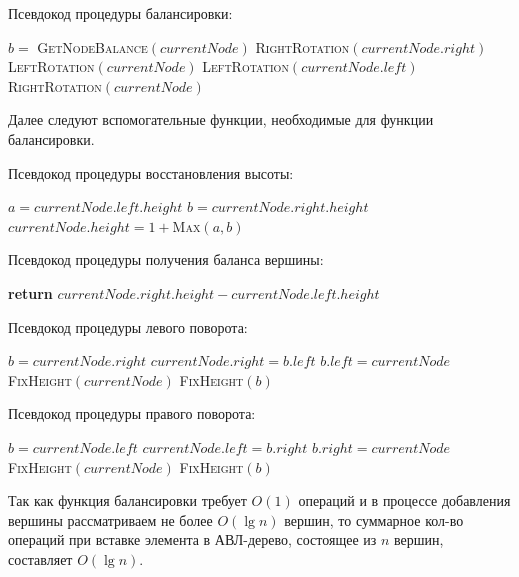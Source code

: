\noindent Псевдокод процедуры балансировки:
\begin{algorithmic}[1]
		\State $b =$ \textsc{GetNodeBalance}$(currentNode)$
				\State \textsc{RightRotation}$(currentNode.right)$
			\EndIf
			\State \textsc{LeftRotation}$(currentNode)$
		\EndIf
				\State \textsc{LeftRotation}$(currentNode.left)$
			\EndIf
			\State \textsc{RightRotation}$(currentNode)$
		\EndIf
	\EndProcedure
\end{algorithmic}

Далее следуют вспомогательные функции, необходимые для функции балансировки.

\noindent Псевдокод процедуры восстановления высоты:
\begin{algorithmic}[1]
	\State $a = currentNode.left.height$
	\State $b = currentNode.right.height$
	\State $currentNode.height = 1+$\textsc{Max}$(a, b)$
	\EndProcedure
\end{algorithmic}

\noindent Псевдокод процедуры получения баланса вершины:
\begin{algorithmic}[1]
		\State \textbf{return} $currentNode.right.height - currentNode.left.height$
	\EndProcedure
\end{algorithmic}

\newpage

\noindent Псевдокод процедуры левого поворота:
\begin{algorithmic}[1]
		\State $b = currentNode.right$
		\State $currentNode.right = b.left$
		\State $b.left = currentNode$
		\State \textsc{FixHeight}$(currentNode)$
		\State \textsc{FixHeight}$(b)$
	\EndProcedure
\end{algorithmic}

\noindent Псевдокод процедуры правого поворота:
\begin{algorithmic}[1]
	\State $b = currentNode.left$
	\State $currentNode.left = b.right$
	\State $b.right = currentNode$
	\State \textsc{FixHeight}$(currentNode)$
	\State \textsc{FixHeight}$(b)$
	\EndProcedure
\end{algorithmic}

Так как функция балансировки требует $O(1)$ операций и в процессе добавления вершины рассматриваем не более $O(\lg n)$ вершин, то суммарное кол-во операций при вставке элемента в АВЛ-дерево, состоящее из $n$ вершин, составляет $O(\lg n)$.

